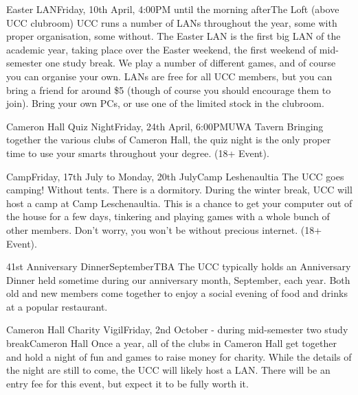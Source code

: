 \newpage

\begin{event}{Easter LAN}{Friday, 10th April, 4:00PM until the morning after}{The Loft (above UCC clubroom)}
UCC runs a number of LANs throughout the year, some with proper organisation, some without. The Easter LAN is the first big LAN of the academic year, taking place over the Easter weekend, the first weekend of mid-semester one study break. We play a number of different games, and of course you can organise your own. LANs are free for all UCC members, but you can bring a friend for around \$5 (though of course you should encourage them to join). Bring your own PCs, or use one of the limited stock in the clubroom.
\end{event}


\begin{event}{Cameron Hall Quiz Night}{Friday, 24th April, 6:00PM}{UWA Tavern}
Bringing together the various clubs of Cameron Hall, the quiz night is the only proper time to use your smarts throughout your degree.  (18+ Event).
\end{event}

\begin{event}{Camp}{Friday, 17th July to Monday, 20th July}{Camp Leshenaultia}
The UCC goes camping! Without tents. There is a dormitory. During the winter break, UCC will host a camp at Camp Leschenaultia. This is a chance to get your computer out of the house for a few days, tinkering and playing games with a whole bunch of other members. Don't worry, you won't be without precious internet. (18+ Event).
\end{event}

\begin{event}{41st Anniversary Dinner}{September}{TBA}
The UCC typically holds an Anniversary Dinner held sometime during our anniversary month, September, each year. Both old and new members come together to enjoy a social evening of food and drinks at a popular restaurant.
\end{event}

\begin{event}{Cameron Hall Charity Vigil}{Friday, 2nd October - during mid-semester two study break}{Cameron Hall}
Once a year, all of the clubs in Cameron Hall get together and hold a night of fun and games to raise money for charity. While the details of the night are still to come, the UCC will likely host a LAN. There will be an entry fee for this event, but expect it to be fully worth it.
\end{event}

